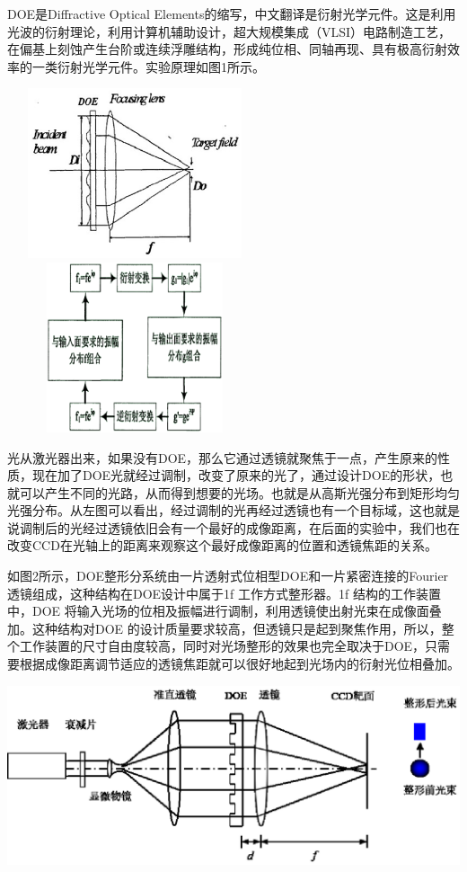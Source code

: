 \documentclass[UTF8]{ctexart}
\makeatletter
\newcommand{\figcaption}{\def\@captype{figure}\caption}
\makeatother
\begin{document}
DOE是Diffractive Optical Elements的缩写，中文翻译是衍射光学元件。这是利用光波的衍射理论，利用计算机辅助设计，超大规模集成（VLSI）电路制造工艺，在偏基上刻蚀产生台阶或连续浮雕结构，形成纯位相、同轴再现、具有极高衍射效率的一类衍射光学元件。实验原理如图1所示。
	\begin{center}
		\includegraphics[width=7.5cm,height=5cm]{Prin.eps}
		\includegraphics[width=7.5cm,height=5cm]{Desi.eps}
		\figcaption{实验原理和DOE设计}\label{Princeple}
	\end{center}
	
光从激光器出来，如果没有DOE，那么它通过透镜就聚焦于一点，产生原来的性质，现在加了DOE光就经过调制，改变了原来的光了，通过设计DOE的形状，也就可以产生不同的光路，从而得到想要的光场。也就是从高斯光强分布到矩形均匀光强分布。从左图可以看出，经过调制的光再经过透镜也有一个目标域，这也就是说调制后的光经过透镜依旧会有一个最好的成像距离，在后面的实验中，我们也在改变CCD在光轴上的距离来观察这个最好成像距离的位置和透镜焦距的关系。
	
如图2所示，DOE整形分系统由一片透射式位相型DOE和一片紧密连接的Fourier透镜组成，这种结构在DOE设计中属于1f 工作方式整形器。1f 结构的工作装置中，DOE 将输入光场的位相及振幅进行调制，利用透镜使出射光束在成像面叠加。这种结构对DOE
的设计质量要求较高，但透镜只是起到聚焦作用，所以，整个工作装置的尺寸自由度较高，同时对光场整形的效果也完全取决于DOE，只需要根据成像距离调节适应的透镜焦距就可以很好地起到光场内的衍射光位相叠加。
\begin{center}
	\includegraphics{Proc.eps}
	\figcaption{DOE整形系统原理示意图}
\end{center}
\end{document}

